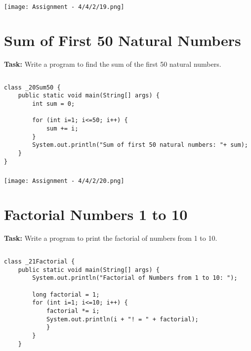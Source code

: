 \documentclass[12pt,a4paper]{article}
\begin{document}
\subsubsection{}
\begin{center}
    \texttt{[image: Assignment - 4/4/2/19.png]}
\end{center}


\section{Sum of First 50 Natural Numbers}
\textbf{Task:} Write a program to find the sum of the first 50 natural numbers.

\subsection{}
\begin{lstlisting}
class _20Sum50 {
    public static void main(String[] args) {
        int sum = 0;
    
        for (int i=1; i<=50; i++) {
            sum += i;
        }
        System.out.println("Sum of first 50 natural numbers: "+ sum);
    }
}
\end{lstlisting}

\subsubsection{}
\begin{center}
    \texttt{[image: Assignment - 4/4/2/20.png]}
\end{center}


\section{Factorial Numbers 1 to 10}
\textbf{Task:} Write a program to print the factorial of numbers from 1 to 10.

\subsection{}
\begin{lstlisting}
class _21Factorial {
    public static void main(String[] args) {
        System.out.println("Factorial of Numbers from 1 to 10: ");
    
        long factorial = 1;
        for (int i=1; i<=10; i++) {
            factorial *= i;
            System.out.println(i + "! = " + factorial);
            }
        }
    }
\end{lstlisting}
\end{document}
